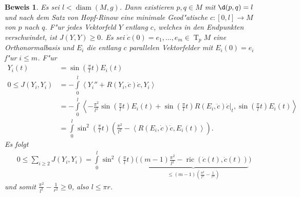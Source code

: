 \documentclass[paper=A4, twoside, chapterprefix=true, bibliography=totoc, headsepline]{scrbook}
\DeclareMathOperator{\diam}{diam} %
\DeclareMathOperator{\ric}{ric} %
\DeclareMathOperator{\T}{T} %
\theoremstyle{plain}
\theoremstyle{nonumberplain}
\newtheorem{bew}{Beweis}
\theoremstyle{empty}
\theoremstyle{break}
\begin{document}
\begin{bew}
  Es sei $l < \diam(M,g)$.
  Dann existieren $p,q \in M$ mit $\d(p,q) = l$ und nach dem Satz von Hopf-Rinow eine minimale Geod"atische $c\colon[0,l] \to M$ von $p$ nach $q$.
  F"ur jedes Vektorfeld $Y$ entlang $c$, welches in den Endpunkten verschwindet, ist $J(Y,Y) \geq 0$.
  Es sei $\dot c(0) = e_1, \ldots, e_m \in \T_pM$ eine Orthonormalbasis und $E_i$ die entlang $c$ parallelen Vektorfelder mit $E_i(0) = e_i$ f"ur $i \leq m$.
  F"ur 
  \begin{align*}
    Y_i(t) & = \sin \left(\frac{\pi}{l}t \right) E_i(t)\\
    0  \leq J(Y_i,Y_i) &= -\int\limits_0^l\left<Y_i''+R(Y_i,\dot c)\dot c,Y_i\right>\\
    & = -\int\limits_0^l\left<-\frac{\pi^2}{l^2}\sin\left(\frac{\pi}{l}t\right)E_i(t) + \sin\left(\frac{\pi}{l}t\right)R(E_i,\dot c)\dot c|_t,\sin\left(\frac{\pi}{l}t\right)E_i(t)\right>\\
    & = \int\limits_0^l \sin^2\left(\frac{\pi}{l}t\right)\left(\frac{\pi^2}{l^2}-\left<R(E_i,\dot c)\dot c,E_i(t)\right>\right).
  \end{align*}
  Es folgt
  \begin{align*}
    0 \leq \sum_{i \geq 2}J(Y_i,Y_i) = \int\limits_0^l\sin^2\left(\frac{\pi}{l}t\right)\Big(\underbrace{(m-1)\frac{\pi^2}{l^2} - \ric(\dot c(t),\dot c(t))}_{\leq (m-1)\left(\frac{\pi^2}{l^2}-\frac{1}{r^2}\right)}\Big)
  \end{align*}
  und somit $\frac{\pi^2}{l^2} - \frac{1}{r^2} \geq 0$, also $l \leq \pi r$.
\end{bew}
\end{document}
